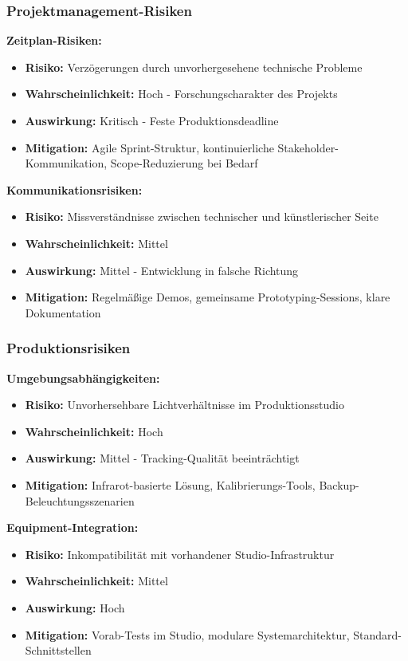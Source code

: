\subsubsection{Projektmanagement-Risiken}

\textbf{Zeitplan-Risiken:}
\begin{itemize}
    \item \textbf{Risiko:} Verzögerungen durch unvorhergesehene technische Probleme
    \item \textbf{Wahrscheinlichkeit:} Hoch - Forschungscharakter des Projekts
    \item \textbf{Auswirkung:} Kritisch - Feste Produktionsdeadline
    \item \textbf{Mitigation:} Agile Sprint-Struktur, kontinuierliche Stakeholder-Kommunikation, Scope-Reduzierung bei Bedarf
\end{itemize}

\textbf{Kommunikationsrisiken:}
\begin{itemize}
    \item \textbf{Risiko:} Missverständnisse zwischen technischer und künstlerischer Seite
    \item \textbf{Wahrscheinlichkeit:} Mittel
    \item \textbf{Auswirkung:} Mittel - Entwicklung in falsche Richtung
    \item \textbf{Mitigation:} Regelmäßige Demos, gemeinsame Prototyping-Sessions, klare Dokumentation
\end{itemize}

\subsubsection{Produktionsrisiken}

\textbf{Umgebungsabhängigkeiten:}
\begin{itemize}
    \item \textbf{Risiko:} Unvorhersehbare Lichtverhältnisse im Produktionsstudio
    \item \textbf{Wahrscheinlichkeit:} Hoch
    \item \textbf{Auswirkung:} Mittel - Tracking-Qualität beeinträchtigt
    \item \textbf{Mitigation:} Infrarot-basierte Lösung, Kalibrierungs-Tools, Backup-Beleuchtungsszenarien
\end{itemize}

\textbf{Equipment-Integration:}
\begin{itemize}
    \item \textbf{Risiko:} Inkompatibilität mit vorhandener Studio-Infrastruktur
    \item \textbf{Wahrscheinlichkeit:} Mittel
    \item \textbf{Auswirkung:} Hoch
    \item \textbf{Mitigation:} Vorab-Tests im Studio, modulare Systemarchitektur, Standard-Schnittstellen
\end{itemize}

